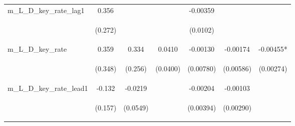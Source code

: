 \documentclass[]{article}
\begin{document}
\begin{center}
\begin{tabular}{lcccccc}
m\_L\_D\_key\_rate\_lag1 & 0.356 &  &  & -0.00359 &  &  \\
\vspace{4pt} & \begin{footnotesize}(0.272)\end{footnotesize} & \begin{footnotesize}\end{footnotesize} & \begin{footnotesize}\end{footnotesize} & \begin{footnotesize}(0.0102)\end{footnotesize} & \begin{footnotesize}\end{footnotesize} & \begin{footnotesize}\end{footnotesize} \\
m\_L\_D\_key\_rate & 0.359 & 0.334 & 0.0410 & -0.00130 & -0.00174 & -0.00455* \\
\vspace{4pt} & \begin{footnotesize}(0.348)\end{footnotesize} & \begin{footnotesize}(0.256)\end{footnotesize} & \begin{footnotesize}(0.0400)\end{footnotesize} & \begin{footnotesize}(0.00780)\end{footnotesize} & \begin{footnotesize}(0.00586)\end{footnotesize} & \begin{footnotesize}(0.00274)\end{footnotesize} \\
m\_L\_D\_key\_rate\_lead1 & -0.132 & -0.0219 &  & -0.00204 & -0.00103 &  \\
\vspace{4pt} & \begin{footnotesize}(0.157)\end{footnotesize} & \begin{footnotesize}(0.0549)\end{footnotesize} & \begin{footnotesize}\end{footnotesize} & \begin{footnotesize}(0.00394)\end{footnotesize} & \begin{footnotesize}(0.00290)\end{footnotesize} & \begin{footnotesize}\end{footnotesize} \\

\end{tabular}
\end{center}
\end{document}

